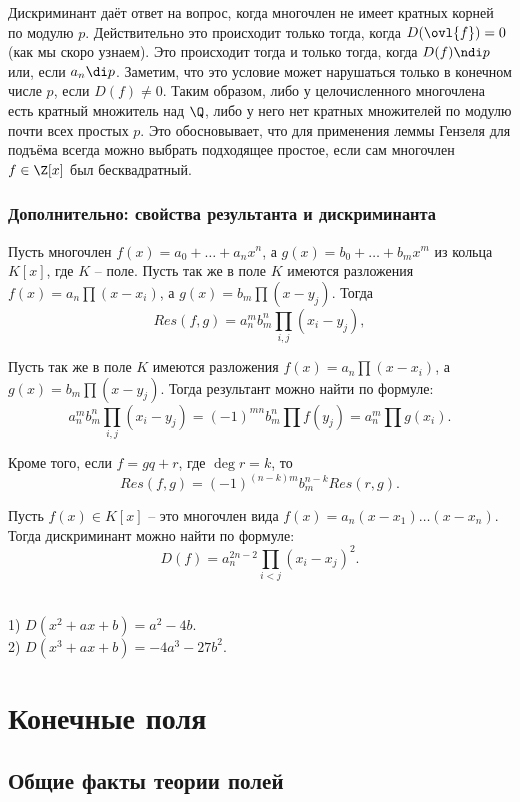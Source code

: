 Дискриминант даёт ответ на вопрос, когда многочлен не имеет кратных корней по модулю $p$. Действительно это происходит только тогда, когда $D(\ovl{f})=0$ (как мы скоро узнаем). Это происходит тогда и только тогда, когда $D(f)\ndi p$ или, если $a_n\di p$. Заметим, что это условие может нарушаться только в конечном числе $p$, если $D(f)\neq 0$. Таким образом, либо у целочисленного многочлена есть кратный множитель над $\Q$, либо у него нет кратных множителей по модулю почти всех простых $p$. Это обосновывает, что для применения леммы Гензеля для подъёма всегда можно выбрать подходящее простое, если сам многочлен $f\in \Z[x]$ был бесквадратный.


\subsection{Дополнительно: свойства результанта и дискриминанта}

\thrm Пусть многочлен $f(x)=a_0+\dots+a_nx^n$, а $g(x)=b_0+\dots+b_mx^m$ из кольца $K[x]$, где $K$ -- поле. Пусть так же в поле $K$ имеются разложения $f(x)=a_n\prod(x-x_i)$, а $g(x)=b_m\prod (x-y_j)$. Тогда
$$Res(f,g)=a_n^mb_m^n \prod_{i,j} (x_i-y_j),$$
\ethrm

\lm Пусть так же в поле $K$ имеются разложения $f(x)=a_n\prod(x-x_i)$, а $g(x)=b_m\prod (x-y_j)$. Тогда результант можно найти по формуле:
$$a_n^mb_m^n \prod_{i,j} (x_i-y_j)=(-1)^{mn}b_m^n \prod f(y_j)=a_n^m \prod g(x_i).$$ 
\elm

\upr Кроме того, если $f=gq+r$, где $\deg r=k$, то 
 $$Res(f,g)=(-1)^{(n-k)m}b_m^{n-k} Res(r,g).$$
\eupr

\lm Пусть $f(x)\in K[x]$ -- это многочлен вида $f(x)=a_n(x-x_1)\dots(x-x_n)$. Тогда дискриминант можно найти по формуле:
$$D(f)=a_n^{2n-2}\prod_{i< j} (x_i-x_j)^2.$$
\elm

\exm\\
1) $D(x^2+ax+b)=a^2-4b$.\\
2) $D(x^3+ax+b)=-4a^3-27b^2$.\\




\chapter{Конечные поля}

\section{Общие факты теории полей}

